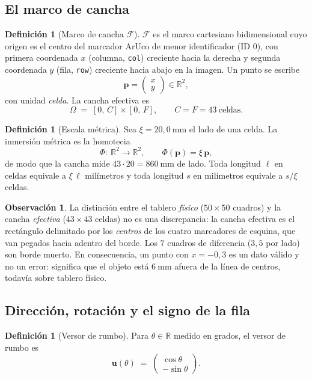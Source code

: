 \documentclass[11pt,a4paper]{article}
\theoremstyle{definition}
\newtheorem{definicion}[teorema]{Definición}
\newtheorem{observacion}[teorema]{Observación}
\newcommand{\R}{\mathbb{R}}
\newcommand{\uu}{\mathbf{u}}
\newcommand{\pp}{\mathbf{p}}
\begin{document}
\subsection{El marco de cancha}

\begin{definicion}[Marco de cancha $\mathcal{F}$]
$\mathcal{F}$ es el marco cartesiano bidimensional cuyo origen es el centro del
marcador ArUco de menor identificador (ID $0$), con primera coordenada $x$ (columna,
\texttt{col}) creciente hacia la derecha y segunda coordenada $y$ (fila, \texttt{row})
creciente hacia abajo en la imagen. Un punto se escribe
\[
  \pp = \begin{pmatrix} x \\ y\end{pmatrix} \in \R^2 ,
\]
con unidad \emph{celda}. La cancha efectiva es
\[
  \Omega \;=\; [0,\,C]\times[0,\,F], \qquad C = F = 43 \ \text{celdas}.
\]
\end{definicion}

\begin{definicion}[Escala métrica]
Sea $\xi = 20{,}0\ \mathrm{mm}$ el lado de una celda. La inmersión métrica es la
homotecia
\[
  \Phi:\ \R^2 \to \R^2, \qquad \Phi(\pp) = \xi\,\pp ,
\]
de modo que la cancha mide $43\cdot 20 = 860\ \mathrm{mm}$ de lado. Toda longitud
$\ell$ en celdas equivale a $\xi\,\ell$ milímetros y toda longitud $s$ en milímetros
equivale a $s/\xi$ celdas.
\end{definicion}

\begin{observacion}
La distinción entre el tablero \emph{físico} ($50\times 50$ cuadros) y la cancha
\emph{efectiva} ($43\times 43$ celdas) no es una discrepancia: la cancha efectiva es
el rectángulo delimitado por los \emph{centros} de los cuatro marcadores de esquina,
que van pegados hacia adentro del borde. Los $7$ cuadros de diferencia
($3{,}5$ por lado) son borde muerto. En consecuencia, un punto con $x = -0{,}3$ es un
dato válido y no un error: significa que el objeto está $6\ \mathrm{mm}$ afuera de la
línea de centros, todavía sobre tablero físico.
\end{observacion}

\subsection{Dirección, rotación y el signo de la fila}

\begin{definicion}[Versor de rumbo]
Para $\theta \in \R$ medido en grados, el versor de rumbo es
\begin{equation}
  \uu(\theta) \;=\; \begin{pmatrix} \cos\theta \\[2pt] -\sin\theta \end{pmatrix}.
  \label{eq:versor}
\end{equation}
\end{definicion}
\end{document}
